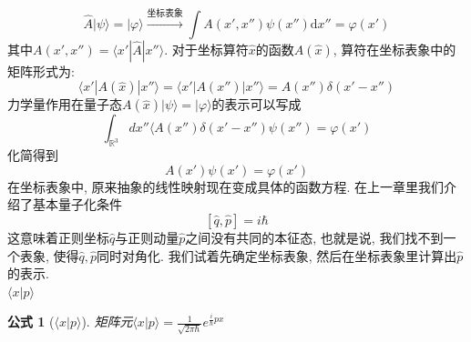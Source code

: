 \documentclass[a4paper,11pt]{book}
\newtheorem{formula}{公式}[section]
\newcommand{\A}{\hat{A}}
\newcommand{\md}{\mathrm{d}}
\newcommand{\x}{\hat{x}}
\newcommand{\p}{\hat{p}}
\newcommand{\q}{\hat{q}}
\begin{document}
\begin{equation*}
  \A|\psi\rangle=|\varphi\rangle\xrightarrow{\text{坐标表象}}\int A(x',x'')\psi(x'')\md x''=\varphi(x')
\end{equation*}
其中$A(x',x'')=\langle x'|\A|x''\rangle$. 对于坐标算符$\x$的函数$A(\x)$, 算符在坐标表象中的矩阵形式为:
\begin{equation*}
  \langle x'|A(\x)|x''\rangle=\langle x'|A(x'')|x''\rangle=A(x'')\delta(x'-x'')
\end{equation*}
力学量作用在量子态$A(\x)|\psi\rangle=|\varphi\rangle$的表示可以写成
\begin{equation*}
  \int_{\mathbb{R}^3}dx''\langle A(x'')\delta(x'-x'')\psi(x'')=\varphi(x')
\end{equation*}
化简得到
\begin{equation*}
  A(x')\psi(x')=\varphi(x')
\end{equation*}
在坐标表象中, 原来抽象的线性映射现在变成具体的函数方程. 在上一章里我们介绍了基本量子化条件
\begin{equation*}
  \left[\q,\p\right]=i\hbar
\end{equation*}
这意味着正则坐标$\q$与正则动量$\p$之间没有共同的本征态, 也就是说, 我们找不到一个表象, 使得$\q,\p$同时对角化. 我们试着先确定坐标表象, 然后在坐标表象里计算出$\p$的表示.\\
$\langle x|p\rangle$
\begin{formula}[$\langle x|p\rangle$]
  矩阵元$\langle x|p\rangle=\frac{1}{\sqrt{2\pi\hbar}}e^{\frac{i}{\hbar}px}$
\end{formula}
\end{document}
